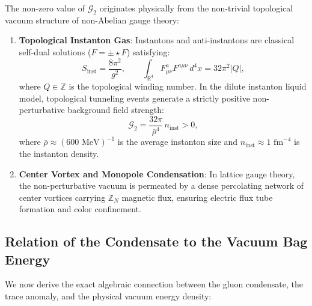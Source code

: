 The non-zero value of $\mathcal{G}_2$ originates physically from the non-trivial topological vacuum structure of non-Abelian gauge theory:
\begin{enumerate}
    \item \textbf{Topological Instanton Gas}: Instantons and anti-instantons are classical self-dual solutions ($F = \pm \star F$) satisfying:
    \begin{equation}
    S_{\mathrm{inst}} = \frac{8\pi^2}{g^2}, \qquad \int_{\mathbb{R}^4} F_{\mu\nu}^a F^{a\mu\nu} \, d^4x = 32\pi^2 |Q|,
    \end{equation}
    where $Q \in \mathbb{Z}$ is the topological winding number. In the dilute instanton liquid model, topological tunneling events generate a strictly positive non-perturbative background field strength:
    \begin{equation}
    \mathcal{G}_2 = \frac{32 \pi}{\bar{\rho}^4} \, n_{\mathrm{inst}} > 0,
    \end{equation}
    where $\bar{\rho} \approx (600 \text{ MeV})^{-1}$ is the average instanton size and $n_{\mathrm{inst}} \approx 1 \text{ fm}^{-4}$ is the instanton density.
    
    \item \textbf{Center Vortex and Monopole Condensation}: In lattice gauge theory, the non-perturbative vacuum is permeated by a dense percolating network of center vortices carrying $\mathbb{Z}_N$ magnetic flux, ensuring electric flux tube formation and color confinement.
\end{enumerate}

\subsection{Relation of the Condensate to the Vacuum Bag Energy}
\label{subsec:bag_energy_relation}

We now derive the exact algebraic connection between the gluon condensate, the trace anomaly, and the physical vacuum energy density:

